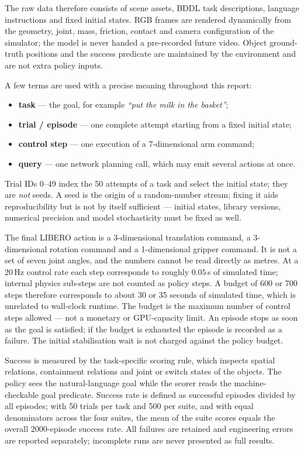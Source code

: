 The raw data therefore consists of scene assets, BDDL task descriptions,
language instructions and fixed initial states. RGB frames are rendered
dynamically from the geometry, joint, mass, friction, contact and camera
configuration of the simulator; the model is never handed a pre-recorded
future video. Object ground-truth positions and the success predicate are
maintained by the environment and are not extra policy inputs.

A few terms are used with a precise meaning throughout this report:

\begin{itemize}
  \item \textbf{task} --- the goal, for example \emph{``put the milk in the
        basket''};
  \item \textbf{trial / episode} --- one complete attempt starting from a fixed
        initial state;
  \item \textbf{control step} --- one execution of a 7-dimensional arm command;
  \item \textbf{query} --- one network planning call, which may emit several
        actions at once.
\end{itemize}

Trial IDs 0--49 index the 50 attempts of a task and select the initial state;
they are \emph{not} seeds. A seed is the origin of a random-number stream;
fixing it aids reproducibility but is not by itself sufficient --- initial
states, library versions, numerical precision and model stochasticity must be
fixed as well.

The final LIBERO action is a 3-dimensional translation command, a
3-dimensional rotation command and a 1-dimensional gripper command. It is not
a set of seven joint angles, and the numbers cannot be read directly as metres.
At a 20\,Hz control rate each step corresponds to roughly $0.05$\,s of
simulated time; internal physics sub-steps are not counted as policy steps.
A budget of 600 or 700 steps therefore corresponds to about 30 or 35 seconds of
simulated time, which is unrelated to wall-clock runtime. The budget is the
maximum number of control steps allowed --- not a monetary or GPU-capacity
limit. An episode stops as soon as the goal is satisfied; if the budget is
exhausted the episode is recorded as a failure. The initial stabilisation wait
is not charged against the policy budget.

Success is measured by the task-specific scoring rule, which inspects spatial
relations, containment relations and joint or switch states of the objects.
The policy sees the natural-language goal while the scorer reads the
machine-checkable goal predicate. Success rate is defined as successful
episodes divided by all episodes; with 50 trials per task and 500 per suite,
and with equal denominators across the four suites, the mean of the suite
scores equals the overall 2000-episode success rate. All failures are retained
and engineering errors are reported separately; incomplete runs are never
presented as full results.

